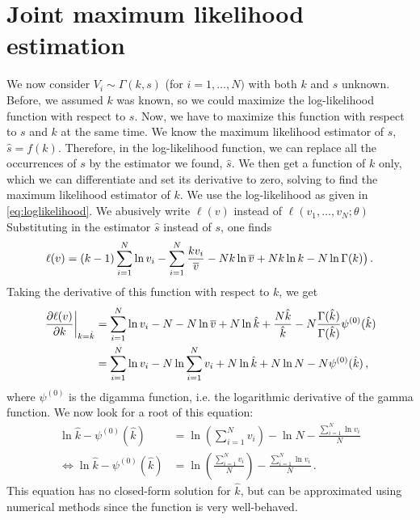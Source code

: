 \documentclass[final]{aomart}
\newtheorem[{}\it]{thm}{Theorem}[section]
\theoremstyle{definition}
\newtheorem*[{}\it]{notation}{Notation}
\numberwithin{equation}{section}
\newcommand{\dig}{\psi^{(0)}}
\newcommand{\eval}[2][\right]{\relax
  \ifx#1\right\relax \left.\fi#2#1\rvert}
\begin{document}
\section{Joint maximum likelihood estimation}
We now consider \(V_i \sim \Gamma(k, s)\) (for \(i = 1,\ldots,N)\) with both \(k\) and \(s\) unknown.
Before, we assumed \(k\) was known, so we could maximize the log-likelihood function with respect to \(s\).
Now, we have to maximize this function with respect to \(s\) and \(k\) at the same time.
We know the maximum likelihood estimator of \(s\), \(\hat{s} = f(k)\).
Therefore, in the log-likelihood function, we can replace all the occurrences of \(s\) by the estimator we found, \(\hat{s}\).
We then get a function of \(k\) only, which we can differentiate  and set its derivative to zero, solving to find the maximum likelihood estimator of \(k\).
We use the log-likelihood as given in \eqref{eq:loglikelihood}.
We abusively write \(\ell(v)\) instead of \(\ell(v_1, \ldots, v_N; \theta)\)
Substituting in the estimator \(\hat{s}\) instead of \(s\), one finds
\begin{align}
\ell(v) = (k-1) \sum_{i=1}^{N}\ln v_i - \sum_{i=1}^{N} \frac{kv_i}{\overline{v}} - N k \ln \overline{v} + N k \ln k - N \ln \Gamma(k)\big)\,.
\end{align}
Taking the derivative of this function with respect to \(k\), we get
\begin{align}
\eval{\frac{\partial \ell(v)}{\partial k}}_{k = \hat{k}} &= \sum_{i=1}^N \ln v_i - N - N \ln \widebar{v} + N \ln \hat{k} + \frac{N\hat{k}}{\hat{k}} - N\frac{\Gamma(\hat{k})}{\Gamma(\hat{k})}\dig(\hat{k})\\
&= \sum_{i=1}^N \ln v_i - N \ln \sum_{i=1}^N v_i + N \ln \hat{k}  + N \ln N - N \dig(\hat{k})\,,
\end{align}
where \(\dig\) is the digamma function, i.e. the logarithmic derivative of the gamma function.
We now look for a root of this equation:
\begin{align}
\ln \hat{k} - \dig(\hat{k}) &= \ln \left(\sum_{i=1}^N v_i\right) - \ln N - \frac{\sum_{i=1}^N \ln v_i}{N}\\
\iff \ln \hat{k}  - \dig(\hat{k}) &= \ln \left(\frac{\sum_{i=1}^N v_i}{N}\right) - \frac{\sum_{i=1}^N \ln v_i}{N}\,.
\end{align}
This equation has no closed-form solution for \(\hat{k}\), but can be approximated using numerical methods since the function is very well-behaved.
\end{document}
